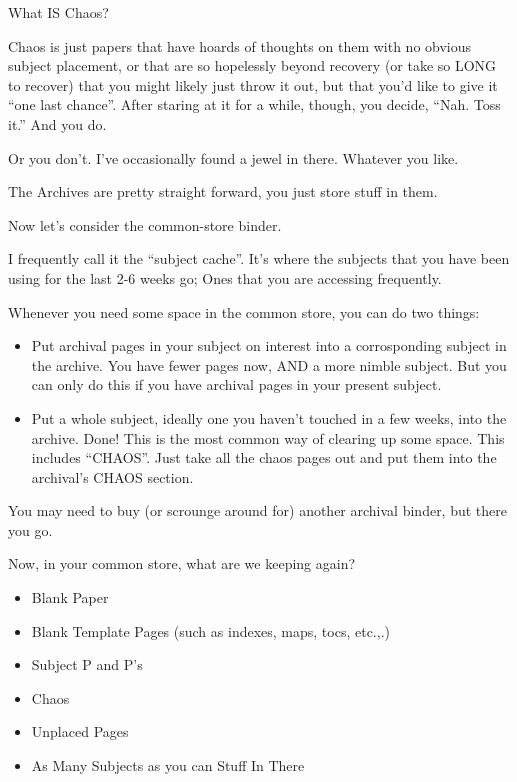 \documentclass[oneside]{book}
\begin{document}
What IS Chaos?

Chaos is just papers that have hoards of thoughts on them with no
obvious subject placement, or that are so hopelessly beyond recovery
(or take so LONG to recover) that you might likely just throw it out,
but that you'd like to give it ``one last chance''. After staring at it
for a while, though, you decide, ``Nah. Toss it.'' And you do.

Or you don't. I've occasionally found a jewel in there. Whatever you
like.

The Archives are pretty straight forward, you just store stuff in
them.

Now let's consider the common-store binder.

I frequently call it the ``subject cache''. It's where the subjects that
you have been using for the last 2-6 weeks go; Ones that you are
accessing frequently.

Whenever you need some space in the common store, you can do two
things:

\begin{itemize}
\item Put archival pages in your subject on interest into a corrosponding
  subject in the archive. You have fewer pages now, AND a more nimble
  subject. But you can only do this if you have archival pages in your
  present subject.
\item Put a whole subject, ideally one you haven't touched in a few weeks,
  into the archive. Done! This is the most common way of clearing up
  some space.
  This includes ``CHAOS''. Just take all the chaos pages out and put
  them into the archival's CHAOS section.
\end{itemize}

You may need to buy (or scrounge around for) another archival binder,
but there you go.

Now, in your common store, what are we keeping again?

\begin{itemize}
\item Blank Paper
\item Blank Template Pages (such as indexes, maps, tocs, etc.,.)
\item Subject P and P's
\item Chaos
\item Unplaced Pages
\item As Many Subjects as you can Stuff In There
\end{itemize}
\end{document}
